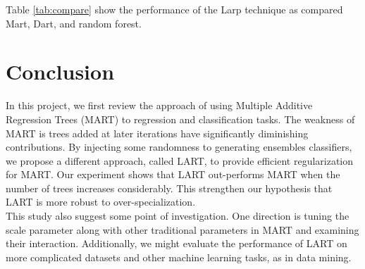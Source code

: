 \documentclass{article} %
\begin{document}
Table \ref{tab:compare} show the performance of the Larp technique as compared Mart, Dart, and random forest.

\section{Conclusion}
In this project, we first review the approach of using Multiple Additive Regression Trees (MART) to regression and classification tasks. The weakness of MART is trees added at later iterations have significantly diminishing contributions. By injecting some randomness to generating ensembles classifiers, we propose a different approach, called LART, to provide efficient regularization for MART. Our experiment shows that LART out-performs MART when the number of trees increases considerably. This strengthen our hypothesis that LART is more robust to over-specialization.\\

This study also suggest some point of investigation. One direction is tuning the scale parameter along with other traditional parameters in MART and examining their interaction. Additionally, we might evaluate the performance of LART on more complicated datasets and other machine learning tasks, as in data mining.



\nocite{*}


\end{document}
